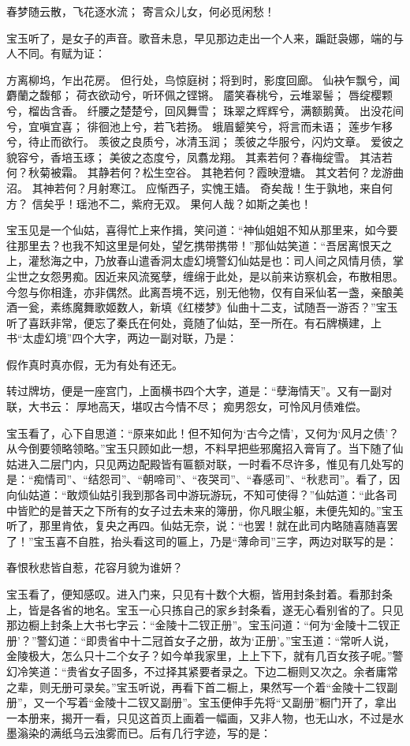 \documentclass[12pt,oneside]{book}
\begin{document}
春梦随云散，飞花逐水流；
寄言众儿女，何必觅闲愁！

宝玉听了，是女子的声音。歌音未息，早见那边走出一个人来，蹁跹袅娜，端的与人不同。有赋为证：

方离柳坞，乍出花房。
但行处，鸟惊庭树；将到时，影度回廊。
仙袂乍飘兮，闻麝蘭之馥郁；
荷衣欲动兮，听环佩之铿锵。
靥笑春桃兮，云堆翠髻；
唇绽樱颗兮，榴齿含香。
纤腰之楚楚兮，回风舞雪；
珠翠之辉辉兮，满额鹅黄。
出没花间兮，宜嗔宜喜；
徘徊池上兮，若飞若扬。
蛾眉颦笑兮，将言而未语；
莲步乍移兮，待止而欲行。
羡彼之良质兮，冰清玉润；
羡彼之华服兮，闪灼文章。
爱彼之貌容兮，香培玉琢；
美彼之态度兮，凤翥龙翔。
其素若何？春梅绽雪。
其洁若何？秋菊被霜。
其静若何？松生空谷。
其艳若何？霞映澄塘。
其文若何？龙游曲沼。
其神若何？月射寒江。
应惭西子，实愧王嫱。
奇矣哉！生于孰地，来自何方？
信矣乎！瑶池不二，紫府无双。
果何人哉？如斯之美也！

宝玉见是一个仙姑，喜得忙上来作揖，笑问道：“神仙姐姐不知从那里来，如今要往那里去？也我不知这里是何处，望乞携带携带！”那仙姑笑道：“吾居离恨天之上，灌愁海之中，乃放春山遣香洞太虚幻境警幻仙姑是也：司人间之风情月债，掌尘世之女怨男痴。因近来风流冤孽，缠绵于此处，是以前来访察机会，布散相思。今忽与你相逢，亦非偶然。此离吾境不远，别无他物，仅有自采仙茗一盏，亲酿美酒一瓮，素练魔舞歌姬数人，新填《红楼梦》仙曲十二支，试随吾一游否？”宝玉听了喜跃非常，便忘了秦氏在何处，竟随了仙姑，至一所在。有石牌横建，上书“太虚幻境”四个大字，两边一副对联，乃是：

假作真时真亦假，无为有处有还无。

转过牌坊，便是一座宫门，上面横书四个大字，道是：“孽海情天”。又有一副对联，大书云：
厚地高天，堪叹古今情不尽；
痴男怨女，可怜风月债难偿。

宝玉看了，心下自思道：“原来如此！但不知何为‘古今之情’，又何为‘风月之债’？从今倒要领略领略。”宝玉只顾如此一想，不料早把些邪魔招入膏肓了。当下随了仙姑进入二层门内，只见两边配殿皆有匾额对联，一时看不尽许多，惟见有几处写的是：“痴情司”、“结怨司”、“朝啼司”、“夜哭司”、“春感司”、“秋悲司”。看了，因向仙姑道：“敢烦仙姑引我到那各司中游玩游玩，不知可使得？”仙姑道：“此各司中皆贮的是普天之下所有的女子过去未来的簿册，你凡眼尘躯，未便先知的。”宝玉听了，那里肯依，复央之再四。仙姑无奈，说：“也罢！就在此司内略随喜随喜罢了！”宝玉喜不自胜，抬头看这司的匾上，乃是“薄命司”三字，两边对联写的是：

春恨秋悲皆自惹，花容月貌为谁妍？

宝玉看了，便知感叹。进入门来，只见有十数个大橱，皆用封条封着。看那封条上，皆是各省的地名。宝玉一心只拣自己的家乡封条看，遂无心看别省的了。只见那边橱上封条上大书七字云：“金陵十二钗正册”。宝玉问道：“何为‘金陵十二钗正册’？”警幻道：“即贵省中十二冠首女子之册，故为‘正册’。”宝玉道：“常听人说，金陵极大，怎么只十二个女子？如今单我家里，上上下下，就有几百女孩子呢。”警幻冷笑道：“贵省女子固多，不过择其紧要者录之。下边二橱则又次之。余者庸常之辈，则无册可录矣。”宝玉听说，再看下首二橱上，果然写一个着“金陵十二钗副册”，又一个写着“金陵十二钗又副册”。宝玉便伸手先将“又副册”橱门开了，拿出一本册来，揭开一看，只见这首页上画着一幅画，又非人物，也无山水，不过是水墨滃染的满纸乌云浊雾而已。后有几行字迹，写的是：
\end{document}
